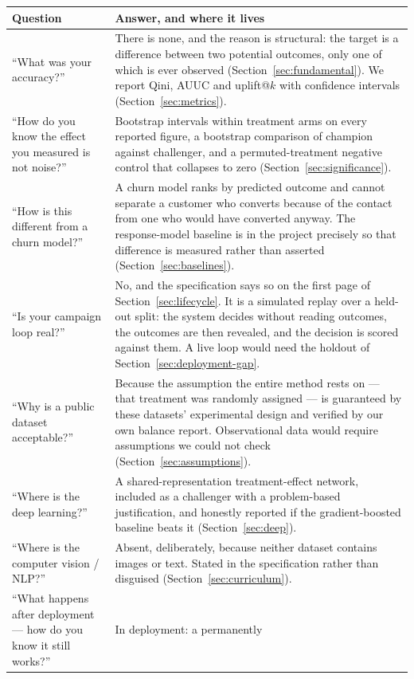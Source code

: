 \documentclass[11pt,a4paper]{article}
\begin{document}
\begin{longtable}{@{}L{6.6cm}L{8.0cm}@{}}
\toprule
\textbf{Question} & \textbf{Answer, and where it lives} \\
\midrule
\endhead
``What was your accuracy?'' & There is none, and the reason is structural: the target is a
difference between two potential outcomes, only one of which is ever observed
(Section~\ref{sec:fundamental}). We report Qini, AUUC and uplift@$k$ with confidence intervals
(Section~\ref{sec:metrics}). \\
``How do you know the effect you measured is not noise?'' & Bootstrap intervals within treatment
arms on every reported figure, a bootstrap comparison of champion against challenger, and a
permuted-treatment negative control that collapses to zero (Section~\ref{sec:significance}). \\
``How is this different from a churn model?'' & A churn model ranks by predicted outcome and cannot
separate a customer who converts because of the contact from one who would have converted anyway.
The response-model baseline is in the project precisely so that difference is measured rather than
asserted (Section~\ref{sec:baselines}). \\
``Is your campaign loop real?'' & No, and the specification says so on the first page of
Section~\ref{sec:lifecycle}. It is a simulated replay over a held-out split: the system decides
without reading outcomes, the outcomes are then revealed, and the decision is scored against them.
A live loop would need the holdout of Section~\ref{sec:deployment-gap}. \\
``Why is a public dataset acceptable?'' & Because the assumption the entire method rests on ---
that treatment was randomly assigned --- is guaranteed by these datasets' experimental design and
verified by our own balance report. Observational data would require assumptions we could not check
(Section~\ref{sec:assumptions}). \\
``Where is the deep learning?'' & A shared-representation treatment-effect network, included as a
challenger with a problem-based justification, and honestly reported if the gradient-boosted
baseline beats it (Section~\ref{sec:deep}). \\
``Where is the computer vision / NLP?'' & Absent, deliberately, because neither dataset contains
images or text. Stated in the specification rather than disguised
(Section~\ref{sec:curriculum}). \\
``What happens after deployment --- how do you know it still works?'' & In deployment: a permanently

\end{longtable}
\end{document}
